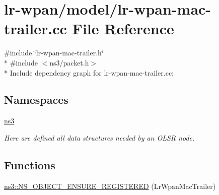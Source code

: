 \hypertarget{lr-wpan-mac-trailer_8cc}{}\section{lr-\/wpan/model/lr-\/wpan-\/mac-\/trailer.cc File Reference}
\label{lr-wpan-mac-trailer_8cc}
{\ttfamily \#include \char`\"{}lr-\/wpan-\/mac-\/trailer.\+h\char`\"{}}\\*
{\ttfamily \#include $<$ns3/packet.\+h$>$}\\*
Include dependency graph for lr-\/wpan-\/mac-\/trailer.cc\+:
\subsection*{Namespaces}
\begin{DoxyCompactItemize}
\item 
 \hyperlink{namespacens3}{ns3}
\begin{DoxyCompactList}\small\item\em Here are defined all data structures needed by an O\+L\+SR node. \end{DoxyCompactList}\end{DoxyCompactItemize}
\subsection*{Functions}
\begin{DoxyCompactItemize}
\item 
\hyperlink{namespacens3_a9b7f5ca2d17ab34ff559ebec0ff2d363}{ns3\+::\+N\+S\+\_\+\+O\+B\+J\+E\+C\+T\+\_\+\+E\+N\+S\+U\+R\+E\+\_\+\+R\+E\+G\+I\+S\+T\+E\+R\+ED} (Lr\+Wpan\+Mac\+Trailer)
\end{DoxyCompactItemize}
